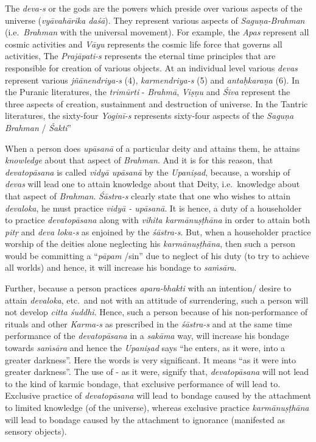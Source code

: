 The \emph{deva-s} or the gods are the powers which preside over various aspects of the universe (\emph{vyāvahārika daśā}). They represent various aspects of \emph{Saguṇa-Brahman} (i.e.\ \emph{Brahman} with the universal movement). For example, the \emph{Apas} represent all cosmic activities and \emph{Vāyu} represents the cosmic life force that governs all activities, The \emph{Prajāpati-s} represents the eternal time principles that are responsible for creation of various objects. At an individual level various \emph{devas} represent various \emph{jñānendriya-s} (4), \emph{karmendriya-s} (5) and \emph{antaḥkaraṇa} (6). In the Puranic literatures, the \emph{trimūrti} - \emph{Brahmā}, \emph{Viṣṇu} and \emph{Śiva} represent the three aspects of creation, sustainment and destruction of universe. In the Tantric literatures, the sixty-four \emph{Yoginī-s} represents sixty-four aspects of the \emph{Saguṇa Brahman} / \emph{Śakti}''

When a person does \emph{upāsanā} of a particular deity and attains them, he attains \emph{knowledge} about that aspect of \emph{Brahman}. And it is for this reason, that \emph{devatopāsana} is called \emph{vidyā upāsanā} by the \emph{Upaniṣad}, because, a worship of \emph{devas} will lead one to attain knowledge about that Deity, i.e.\ knowledge about that aspect of \emph{Brahman}. \emph{Śāstra-s} clearly state that one who wishes to attain \emph{devaloka}, he must practice \emph{vidyā - upāsanā}. It is hence, a duty of a householder to practice \emph{devatopāsana} along with \emph{vihita karmānuṣṭhāna} in order to attain both \emph{pitṛ} and \emph{deva loka-s} as enjoined by the \emph{śāstra-s}. But, when a householder practice worship of the deities alone neglecting his \emph{karmānuṣṭhāna}, then such a person would be committing a ``\emph{pāpam} /sin'' due to neglect of his duty (to try to achieve all worlds) and hence, it will increase his bondage to \emph{saṁsāra}.

Further, because a person practices \emph{apara-bhakti} with an intention/ desire to attain \emph{devaloka}, etc.\ and not with an attitude of surrendering, such a person will not develop \emph{citta śuddhi}. Hence, such a person because of his non-performance of rituals and other \emph{Karma-s} as prescribed in the \emph{śāstra-s} and at the same time performance of the \emph{devatopāsana} in a \emph{sakāma} way, will increase his bondage towards \emph{saṁsāra} and hence the \emph{Upaniṣad} says ``he enters, as it were, into a greater darkness''. Here the words  is very significant. It means ``as it were into greater darkness''. The use of - as it were, signify that, \emph{devatopāsana} will not lead to the kind of karmic bondage, that exclusive performance of will lead to. Exclusive practice of \emph{devatopāsana} will lead to bondage caused by the attachment to limited knowledge (of the universe), whereas exclusive practice \emph{karmānuṣṭhāna} will lead to bondage caused by the attachment to ignorance (manifested as sensory objects).

